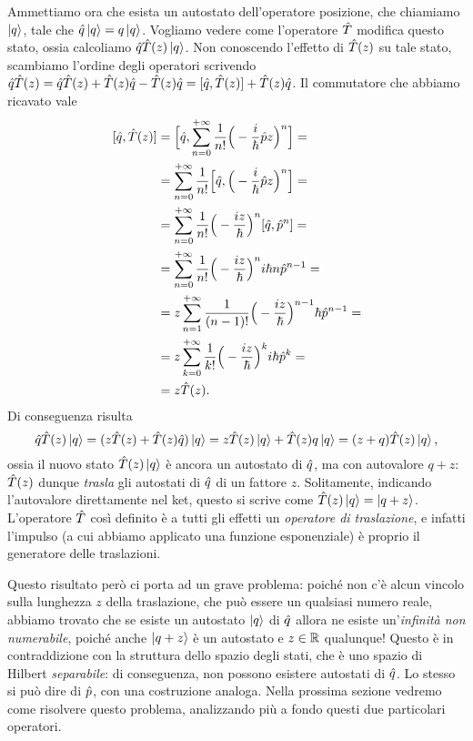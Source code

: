 Ammettiamo ora che esista un autostato dell'operatore posizione, che chiamiamo $\left|{q}\right\rangle$, tale che $\hat{q}\left|{q}\right\rangle=q\left|{q}\right\rangle$.
Vogliamo vedere come l'operatore $\hat{T}$ modifica questo stato, ossia calcoliamo $\hat{q}\hat{T}(z)\left|{q}\right\rangle$.
Non conoscendo l'effetto di $\hat{T}(z)$ su tale stato, scambiamo l'ordine degli operatori scrivendo $\hat{q}\hat{T}(z)=\hat{q}\hat{T}(z)+\hat{T}(z)\hat{q}-\hat{T}(z)\hat{q}=[\hat{q},\hat{T}(z)]+\hat{T}(z)\hat{q}$.
Il commutatore che abbiamo ricavato vale
\begin{equation}
	\begin{split}
		[\hat{q},\hat{T}(z)]&=\Big[\hat{q},\sum_{{n}=0}^{+\infty}\frac1{n!}\Big(-\frac{i}{\hbar}\hat{p}z\Big)^n\Big]=\\
		&=\sum_{{n}=0}^{+\infty}\frac1{n!}\Big[\hat{q},\Big(-\frac{i}{\hbar}\hat{p}z\Big)^n\Big]=\\
		&=\sum_{{n}=0}^{+\infty}\frac1{n!}\Big(-\frac{iz}{\hbar}\Big)^n[\hat{q},\hat{p}^n]=\\
		&=\sum_{{n}=0}^{+\infty}\frac1{n!}\Big(-\frac{iz}{\hbar}\Big)^ni\hbar n\hat{p}^{n-1}=\\
		&=z\sum_{{n}=1}^{+\infty}\frac1{(n-1)!}\Big(-\frac{iz}{\hbar}\Big)^{n-1}\hbar\hat{p}^{n-1}=\\
		&=z\sum_{{k}=0}^{+\infty}\frac1{k!}\Big(-\frac{iz}{\hbar}\Big)^ki\hbar \hat{p}^k=\\
		&=z\hat{T}(z).
	\end{split}
	\label{eq:commutatore-posizione-traslazione}
\end{equation}
Di conseguenza risulta
\begin{equation}
	\hat{q}\hat{T}(z)\left|{q}\right\rangle=(z\hat{T}(z)+\hat{T}(z)\hat{q})\left|{q}\right\rangle=z\hat{T}(z)\left|{q}\right\rangle+\hat{T}(z)q\left|{q}\right\rangle=(z+q)\hat{T}(z)\left|{q}\right\rangle,
\end{equation}
ossia il nuovo stato $\hat{T}(z)\left|{q}\right\rangle$ è ancora un autostato di $\hat{q}$, ma con autovalore $q+z$: $\hat{T}(z)$ dunque \emph{trasla} gli autostati di $\hat{q}$ di un fattore $z$.
Solitamente, indicando l'autovalore direttamente nel ket, questo si scrive come $\hat{T}(z)\left|{q}\right\rangle=\left|{q+z}\right\rangle$.
L'operatore $\hat{T}$ cos\`i definito è a tutti gli effetti un \emph{operatore di traslazione}, e infatti l'impulso (a cui abbiamo applicato una funzione esponenziale) è proprio il generatore delle traslazioni.

Questo risultato però ci porta ad un grave problema: poich\'e non c'è alcun vincolo sulla lunghezza $z$ della traslazione, che può essere un qualsiasi numero reale, abbiamo trovato che se esiste un autostato $\left|{q}\right\rangle$ di $\hat{q}$ allora ne esiste un'\emph{infinità non numerabile}, poich\'e anche $\left|{q+z}\right\rangle$ è un autostato e $z\in\mathbb{R}$ qualunque!
Questo è in contraddizione con la struttura dello spazio degli stati, che è uno spazio di Hilbert \emph{separabile}: di conseguenza, non possono esistere autostati di $\hat{q}$.
Lo stesso si può dire di $\hat{p}$, con una costruzione analoga.
Nella prossima sezione vedremo come risolvere questo problema, analizzando più a fondo questi due particolari operatori.
